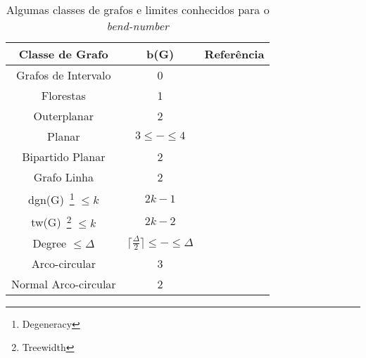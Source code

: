 \begin{table}[h]
\caption{Algumas classes de grafos e limites conhecidos para o \textit{bend-number}}
\label{tab:limitesBenNumber}
\begin{center}
\begin{tabular}{|c|c|c|}
\hline 
Classe de Grafo & b(G) & Referência \\ 
\hline \hline  
Grafos de Intervalo & 0 & \cite{golumbic2009} \\ 
\hline 
Florestas & 1 & \cite{golumbic2009} \\ 
\hline 
Outerplanar &  2 & \cite{daniel2014b} \\ 
\hline 
Planar & $3 \leq - \leq 4$ & \cite{daniel2014b}\\ 
\hline  
Bipartido Planar & 2 & \cite{biedl2010} \\ 
\hline 
Grafo Linha & 2 & \cite{biedl2010} \\ 
\hline 
dgn(G)~\footnote{Degeneracy} $\leq k$ & $2k-1$ & \cite{daniel2014b} \\ 
\hline 
tw(G)~\footnote{Treewidth} $\leq k$ & $2k-2$ & \cite{daniel2014b} \\ 
\hline 
Degree $\leq \Delta$ & $ 	\lceil \frac{\Delta}{2}\rceil\leq - \leq\Delta $ & \cite{daniel2014b} \\ 
\hline 
Arco-circular & 3 & \cite{alcon2016} \\ 
\hline 
Normal Arco-circular & 2 & \cite{alcon2016} \\ \hline 
\end{tabular} 
\end{center}
\end{table}
